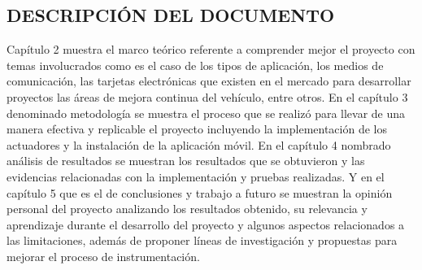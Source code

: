 \subsection{DESCRIPCIÓN DEL DOCUMENTO}

Capítulo 2 muestra el marco teórico referente a comprender mejor el proyecto con temas involucrados como es el caso de los tipos de aplicación, los medios de comunicación, las tarjetas electrónicas que existen en el mercado para desarrollar proyectos las áreas de mejora continua del vehículo, entre otros. En el capítulo 3 denominado metodología se muestra el proceso que se realizó para llevar de una manera efectiva y replicable el proyecto incluyendo la implementación de los actuadores y la instalación de la aplicación móvil. En el capítulo 4 nombrado análisis de resultados se muestran los resultados que se obtuvieron y las evidencias relacionadas con la implementación y pruebas realizadas. Y en el capítulo 5 que es el de conclusiones y trabajo a futuro se muestran la opinión personal del proyecto analizando los resultados obtenido, su relevancia y aprendizaje durante el desarrollo del proyecto y algunos aspectos relacionados a las limitaciones, además de proponer líneas de investigación y propuestas para mejorar el proceso de instrumentación.

